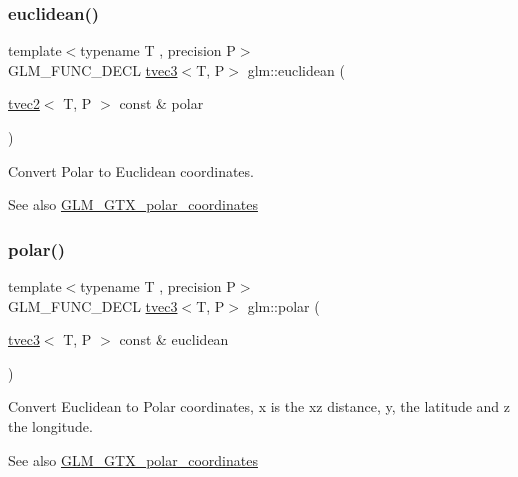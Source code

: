 \subsubsection{\texorpdfstring{euclidean()}{euclidean()}}
{\footnotesize\ttfamily template$<$typename T , precision P$>$ \\
G\+L\+M\+\_\+\+F\+U\+N\+C\+\_\+\+D\+E\+CL \hyperlink{structglm_1_1tvec3}{tvec3}$<$T, P$>$ glm\+::euclidean (\begin{DoxyParamCaption}\item[{\hyperlink{structglm_1_1tvec2}{tvec2}$<$ T, P $>$ const \&}]{polar }\end{DoxyParamCaption})}

Convert Polar to Euclidean coordinates.

\begin{DoxySeeAlso}{See also}
\hyperlink{group__gtx__polar__coordinates}{G\+L\+M\+\_\+\+G\+T\+X\+\_\+polar\+\_\+coordinates} 
\end{DoxySeeAlso}
\mbox{\label{group__gtx__polar__coordinates_gafcf95a38c780a4ad5ba14c8ac9e522bb}} 
\subsubsection{\texorpdfstring{polar()}{polar()}}
{\footnotesize\ttfamily template$<$typename T , precision P$>$ \\
G\+L\+M\+\_\+\+F\+U\+N\+C\+\_\+\+D\+E\+CL \hyperlink{structglm_1_1tvec3}{tvec3}$<$T, P$>$ glm\+::polar (\begin{DoxyParamCaption}\item[{\hyperlink{structglm_1_1tvec3}{tvec3}$<$ T, P $>$ const \&}]{euclidean }\end{DoxyParamCaption})}

Convert Euclidean to Polar coordinates, x is the xz distance, y, the latitude and z the longitude.

\begin{DoxySeeAlso}{See also}
\hyperlink{group__gtx__polar__coordinates}{G\+L\+M\+\_\+\+G\+T\+X\+\_\+polar\+\_\+coordinates} 
\end{DoxySeeAlso}
